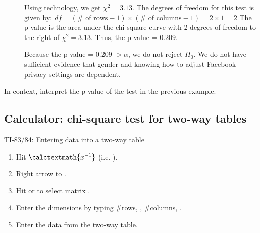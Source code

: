 \begin{examplewrap}
\begin{nexample}
\begin{description}
\item[]  Using technology, we get $\chi^2 = 3.13$.  The degrees of freedom for this test is given by: $df = (\# \text{ of rows} - 1) \times (\# \text{ of columns} - 1) = 2\times 1 = 2$
\newline  The p-value is the area under the chi-square curve with 2 degrees of freedom to the right of $\chi^2=3.13$.  Thus, the p-value = 0.209.
\item[]  Because the p-value = 0.209 $ > \alpha$, we do not reject $H_0$. We do not have sufficient evidence that gender and knowing how to adjust Facebook privacy settings are dependent.
\end{description}
\end{nexample}
\end{examplewrap}

\begin{exercisewrap}
\begin{nexercise}
In context, interpret the p-value of the test in the previous example.\footnotemark
\end{nexercise}
\end{exercisewrap}


\D{\newpage}

\subsection{Calculator: chi-square test for two-way tables}
\label{calcchisq2way}

\begin{onebox}{ TI-83/84: Entering data into a two-way table}
\label{2waytable}
\begin{enumerate}
\setlength{\itemsep}{0mm}
\item Hit  $\calctextmath{x^{-1}}$ (i.e. ).
\item Right arrow to .
\item Hit  or  to select matrix .
\item Enter the dimensions by typing \#rows, , \#columns, .
\item Enter the data from the two-way table.
\end{enumerate}
\end{onebox}

